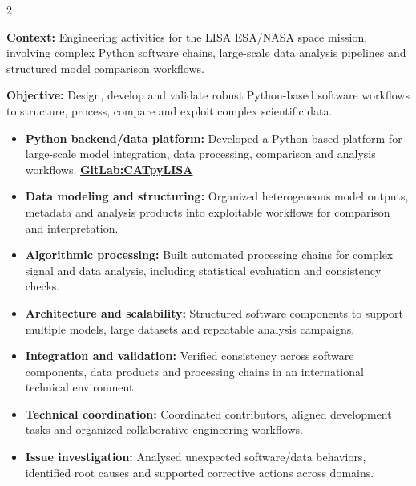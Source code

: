 \documentclass[8pt,a4paper,ragged2e,withhyper]{altacv}
\begin{document}
\begin{paracol}{2}
\divider


\textbf{Context:} Engineering activities for the LISA ESA/NASA space mission, involving complex Python software chains, large-scale data analysis pipelines and structured model comparison workflows.

\textbf{Objective:} Design, develop and validate robust Python-based software workflows to structure, process, compare and exploit complex scientific data.

\begin{itemize}
\item \textbf{Python backend/data platform:} Developed a Python-based platform for large-scale model integration, data processing, comparison and analysis workflows. \textcolor{DarkPastelRed}{\href{https://gitlab.oca.eu/gboileau/lisa_l3_tools}{\bf GitLab:CATpyLISA}}
\item \textbf{Data modeling and structuring:} Organized heterogeneous model outputs, metadata and analysis products into exploitable workflows for comparison and interpretation.
\item \textbf{Algorithmic processing:} Built automated processing chains for complex signal and data analysis, including statistical evaluation and consistency checks.
\item \textbf{Architecture and scalability:} Structured software components to support multiple models, large datasets and repeatable analysis campaigns.
\item \textbf{Integration and validation:} Verified consistency across software components, data products and processing chains in an international technical environment.
\item \textbf{Technical coordination:} Coordinated contributors, aligned development tasks and organized collaborative engineering workflows.
\item \textbf{Issue investigation:} Analysed unexpected software/data behaviors, identified root causes and supported corrective actions across domains.
\end{itemize}

\divider



\end{paracol}
\end{document}
